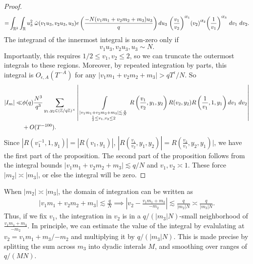 \begin{proof}
\begin{align*}
        =&\int_{\reals^2}\int_\reals u_3^2 \ \tilde{\omega}(v_1u_3,v_2u_3,u_3) e\left(\frac{-N(v_1m_1+v_2m_2+m_3)u_3}{q}\right)  du_3 \ {\left(\frac{v_1}{v_2}\right)}^{it_1} {\left(v_2\right)}^{it_2}{\left(\frac{1}{v_1}\right)}^{it_3}  \ dv_1\ dv_2.\\
    \end{align*}
    The integrand of the innermost integral is non-zero only if \[
        v_1u_3,v_2u_3,u_3\sim N.
    \]
    Importantly, this requires $1/2 \leq v_1,v_2 \leq 2$, so we can truncate the outermost integrals to these regions. Moreover, by repeated integration by parts, this integral is $O_{\epsilon, A}(T^{-A})$ for any $|v_1m_1+v_2m_2+m_3|>qT^\epsilon/N$.
    So 
    \begin{align*}
        |I_m|\ll &\phi(q) \frac{N^3}{q^3}  
        \sum_{y_1,y_2\in (\mathbb{Z}/q\mathbb{Z})^\times}\left|\ \int\displaylimits_{\substack{
            |v_1m_1+v_2m_2+m_3|\lesssim \frac{q}{N}\\
            \frac{1}{2}\leq v_1,v_2\leq 2
        }} R\left(\frac{v_1}{v_2},y_1,y_2\right)
        R(v_2,y_2)R\left(\frac{1}{v_1},1,y_1\right) dv_1 \ dv_2 \right|\\ &+ O(T^{-100}).\\
    \end{align*}
    Since $|R(v_1^{-1},1,y_1)|=|R(v_1,y_1)|$, $| R\left(\frac{v_1}{v_2},y_1,y_2\right)| = R\left(\frac{v_2}{v_1},y_2,y_1\right)|$, we have the first part of the proposition.
    The second part of the proposition follows from the integral bounds $|v_1m_1+v_2m_2+m_3|\lesssim q/N$
    and $v_1,v_2\asymp 1$. These force $|m_2| \asymp|m_3|$, or else the integral will be zero.

    \end{proof}
\fi
\iffalse
We define \begin{align*}
	A_{m,\chi_1,\chi_2,\chi_3}&\defeq \sum_{x\in (\mathbb{Z}/q\mathbb{Z})^3}\chi_1\bar{\chi}_3(x_1)\chi_2\bar{\chi}_1(x_2)\chi_3\bar{\chi}_2(x_3) e\left(\frac{-x\cdot m}{q}\right)\\
	R(v,n_1,n_2)&\defeq \sum_{(t,\chi)\in \mathcal{S}} 
	\chi({n_1})\bar{\chi}(n_2)v^{it},\\
	R(v,n)&\defeq R(v,n,1).
\end{align*}
\fi
When $|m_2|\asymp|m_3|$, the domain of integration can be written as\begin{align*}
    |v_1m_1+v_2m_2+m_3|\lesssim \frac{q}{N} \implies \left|v_2 - \frac{v_1m_1+m_3}{-m_2}\right|\lesssim \frac{q}{|m_2|N} \asymp \frac{q}{|m_3|N}.
\end{align*}
Thus, if we fix $v_1$, the integration in $v_2$ is in a ${q}/{(|m_3|N)}$-small neighborhood of $\frac{v_1m_1+m_3}{-m_2}$. In principle, we can estimate the value of the integral by evalulating at 
$v_2 = {v_1m_1+m_3}/{-m_2}$ and multiplying it by $q/(|m_3|N)$. This is made precise by splitting the sum across $m_3$ into dyadic interals $M$, and smoothing over ranges of ${q}/{(MN)}$.

